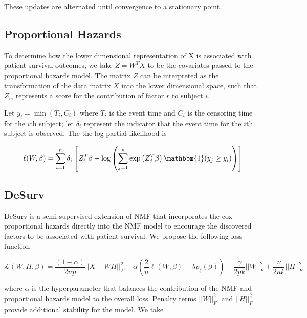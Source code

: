 \documentclass[9pt,twocolumn,twoside,]{pnas-new}
\begin{document}
These updates are alternated until convergence to a stationary point.

\subsection*{Proportional Hazards}\label{proportional-hazards}

To determine how the lower dimensional representation of X is associated
with patient survival outcomes, we take \(Z=W^TX\) to be the covariates
passed to the proportional hazards model. The matrix \(Z\) can be
interpreted as the transformation of the data matrix \(X\) into the
lower dimensional space, such that \(Z_{ri}\) represents a score for the
contribution of factor \(r\) to subject \(i\).

Let \(y_i = \min(T_i,C_i)\) where \(T_i\) is the event time and \(C_i\)
is the censoring time for the \(i\)th subject; let \(\delta_i\)
represent the indicator that the event time for the \(i\)th subject is
observed. The the log partial likelihood is

\begin{equation}
    \ell(W,\beta) = \sum_{i=1}^n \delta_i \left[Z_i^T\beta - \log\left(\sum_{j=1}^n \exp \left(Z_j^T\beta\right) \mathbbm{1} (y_j \geq y_i) \right)\right]
\end{equation}

\subsection*{DeSurv}\label{desurv}

DeSurv is a semi-supervised extension of NMF that incorporates the cox
proportional hazards directly into the NMF model to encourage the
discovered factors to be associated with patient survival. We propose
the following loss function

\begin{equation}
    \mathcal{L}(W,H,\beta) = \frac{(1-\alpha)}{2np}||X-WH||^2_F - \alpha(\frac{2}{n}\ell(W,\beta) - \lambda p_{\xi}(\beta)) + \frac{\gamma}{2pk} ||W||^2_F + \frac{\nu}{2nk} ||H||^2_F
\end{equation}

where \(\alpha\) is the hyperparameter that balances the contribution of
the NMF and proportional hazards model to the overall loss. Penalty
terms \(||W||_F^2\), and \(||H||_F^2\) provide additional stability for
the model. We take
\end{document}
